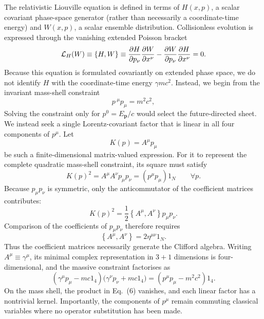 \documentclass[final,5p,times,twocolumn]{elsarticle}
\begin{document}
The relativistic Liouville equation is defined in terms of $H(x,p)$, a scalar covariant phase-space generator (rather than necessarily a coordinate-time energy) and $W(x,p)$, a scalar ensemble distribution.  Collisionless evolution is expressed through the vanishing extended Poisson
bracket~\cite{MARSDEN198629,hakim2011introduction}
\begin{equation}
  \mathcal{L}_H(W)
  \equiv
  \PB{H}{W}
  \equiv 
  \PD{H}{p_\nu}
  \PD{W}{x^\nu}
  -
  \PD{W}{p_\nu}
  \PD{H}{x^\nu}
  =0.
  \label{eq:relL}
\end{equation}
Because this equation is formulated covariantly on extended phase space, we do not identify $H$ with the coordinate-time energy
$\gamma mc^2$. Instead, we begin from the invariant mass-shell
constraint
\begin{equation}
  p\,^\mu p_\mu=m^2c^2,
  \label{eq:mass-shell}
\end{equation}
Solving the constraint only for $p^0=E_{\bm p}/c$ would select the
future-directed sheet. We instead seek a single Lorentz-covariant
factor that is linear in all four components of $p^\mu$. Let
$$
    K(p)=A^\mu p_\mu
$$
be such a finite-dimensional matrix-valued expression. For it to
represent the complete quadratic mass-shell constraint, its square
must satisfy
\begin{equation}
    K(p)^2
    =
    A^\mu A^\nu p_\mu p_\nu
    =
    \left(p^\mu p_\mu\right){1_N}
    \qquad
     \forall p .
\end{equation}
Because $p_\mu p_\nu$ is symmetric, only the anticommutator of the
coefficient matrices contributes:
\begin{equation}
    K(p)^2
    =
    \frac{1}{2}
    \left\{A^\mu,A^\nu\right\}p_\mu p_\nu .
\end{equation}
Comparison of the coefficients of $p_\mu p_\nu$ therefore requires
\begin{equation}
    \left\{A^\mu,A^\nu\right\}
    =
    2\eta^{\mu\nu}{1_N}.
\end{equation}
Thus the coefficient matrices necessarily generate the Clifford
algebra. Writing $A^\mu\equiv\gamma^\mu$, its minimal complex
representation in $3+1$ dimensions is four-dimensional, and the
massive constraint factorises as
\begin{equation}
    \left(\gamma^\mu p_\mu-mc {1}_4\right)
    \Big(\gamma^\nu p_\nu+mc {1}_4\Big)
    =
    \left(p^\mu p_\mu-m^2c^2\right){1}_4 .  \label{eq:factorisation}
\end{equation}
On the mass shell, the product in Eq.~(6) vanishes, and each linear factor has a nontrivial kernel. Importantly, the components of \(p^\mu\) remain commuting classical variables where no operator substitution has been made. 
\end{document}
